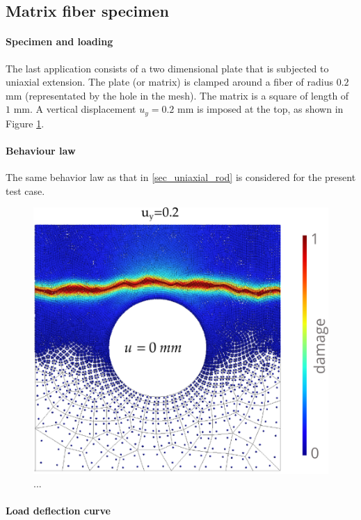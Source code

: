 \subsection{Matrix fiber specimen}

\paragraph{Specimen and loading}

The last application consists of a two dimensional plate that is subjected to uniaxial
extension. The plate (or matrix) is clamped around a fiber of radius $0.2$ mm (representated by the hole in the mesh).
The matrix is a square of length of $1$ mm. A vertical
displacement $u_y = 0.2$ mm is imposed at the top, as shown in Figure \ref{fig_matrix}.

\paragraph{Behaviour law}

The same behavior law as that in \ref{sec_uniaxial_rod} is considered for the present test case.
%
% 
% 
\begin{figure}[H]
    \centering
    \includegraphics[width=7.cm]{../chapter_03_hho_micromorphic/figures/plate.png}
    \caption{...}
    \label{fig_matrix}
\end{figure}

\paragraph{Load deflection curve}

